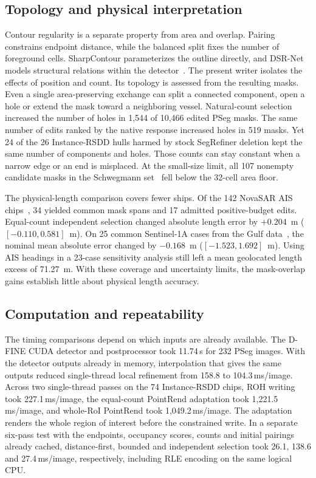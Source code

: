 \documentclass[journal]{IEEEtran}
\begin{document}
\subsection{Topology and physical interpretation}

Contour regularity is a separate property from area and overlap. Pairing constrains endpoint distance, while the balanced split fixes the number of foreground cells. SharpContour parameterizes the outline directly, and DSR-Net models structural relations within the detector~\cite{sharpcontour,dsr}. The present writer isolates the effects of position and count. Its topology is assessed from the resulting masks.
Even a single area-preserving exchange can split a connected component, open a hole or extend the mask toward a neighboring vessel. Natural-count selection increased the number of holes in 1,544 of 10,466 edited PSeg masks. The same number of edits ranked by the native response increased holes in 519 masks. Yet 24 of the 26 Instance-RSDD hulls harmed by stock SegRefiner deletion kept the same number of components and holes. Those counts can stay constant when a narrow edge or an end is misplaced. At the small-size limit, all 107 nonempty candidate masks in the Schwegmann set~\cite{schwegmann} fell below the 32-cell area floor.

The physical-length comparison covers fewer ships. Of the 142 NovaSAR AIS chips~\cite{nastar}, 34 yielded common mask spans and 17 admitted positive-budget edits. Equal-count independent selection changed absolute length error by \(+0.204\)~m (\([-0.110,0.581]\)~m). On 25 common Sentinel-1A cases from the Gulf data~\cite{gulf}, the nominal mean absolute error changed by \(-0.168\)~m (\([-1.523,1.692]\)~m). Using AIS headings in a 23-case sensitivity analysis still left a mean geolocated length excess of 71.27~m. With these coverage and uncertainty limits, the mask-overlap gains establish little about physical length accuracy.

\subsection{Computation and repeatability}
The timing comparisons depend on which inputs are already available. The D-FINE CUDA detector and postprocessor took 11.74\,s for 232 PSeg images. With the detector outputs already in memory, interpolation that gives the same outputs reduced single-thread local refinement from 158.8 to 104.3\,ms/image. Across two single-thread passes on the 74 Instance-RSDD chips, ROH writing took 227.1\,ms/image, the equal-count PointRend adaptation took 1,221.5\,ms/image, and whole-RoI PointRend took 1,049.2\,ms/image. The adaptation renders the whole region of interest before the constrained write. In a separate six-pass test with the endpoints, occupancy scores, counts and initial pairings already cached, distance-first, bounded and independent selection took 26.1, 138.6 and 27.4\,ms/image, respectively, including RLE encoding on the same logical CPU.
\end{document}
